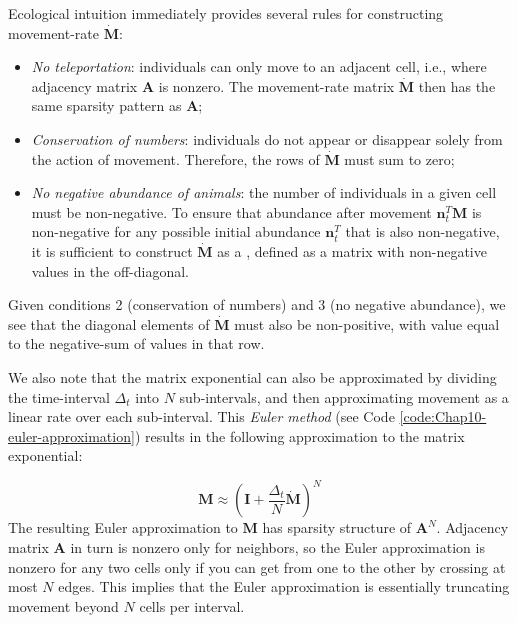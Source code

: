 Ecological intuition immediately provides several rules for constructing movement-rate \(\dot{\mathbf{M}}\): 
\begin{itemize}
    \item \textit{No teleportation}:  individuals can only move to an adjacent cell, i.e., where adjacency matrix \(\mathbf A\) is nonzero.  The movement-rate matrix \( \dot{\mathbf{M}} \) then has the same sparsity pattern as \(\mathbf A\); 

    \item \textit{Conservation of numbers}:  individuals do not appear or disappear solely from the action of movement.  Therefore, the rows of \(\dot{\mathbf{M}}\) must sum to zero;

    \item \textit{No negative abundance of animals}:  the number of individuals in a given cell must be non-negative.  To ensure that abundance after movement \(\mathbf{n}_t^T \mathbf{M}\) is non-negative for any possible initial abundance \(\mathbf{n}_t^T\) that is also non-negative, it is sufficient to construct \(\dot{\mathbf{M}}\) as a , defined as a matrix with non-negative values in the off-diagonal.  
\end{itemize}
Given conditions 2 (conservation of numbers) and 3 (no negative abundance), we see that the diagonal elements of \(\dot{\mathbf{M}}\) must also be non-positive, with value equal to the negative-sum of values in that row.

We also note that the matrix exponential can also be approximated by dividing the time-interval \(\Delta_t\) into \(N\) sub-intervals, and then approximating movement as a linear rate over each sub-interval.  This \textit{Euler method} (see Code \ref{code:Chap10-euler-approximation}) results in the following approximation to the matrix exponential:

\begin{equation} \label{eq:Chap10_euler_approximation}
    \mathbf{M} \approx (\mathbf{I} + \frac{\Delta_t}{N}\dot{\mathbf{M}})^N
\end{equation}
The resulting Euler approximation to \(\mathbf{M}\) has sparsity structure of \( \mathbf{A}^N \).  Adjacency matrix \(\mathbf{A}\) in turn is nonzero only for neighbors, so the Euler approximation is nonzero for any two cells only if you can get from one to the other by crossing at most \(N\) edges.  This implies that the Euler approximation is essentially truncating movement beyond \(N\) cells per interval.   

